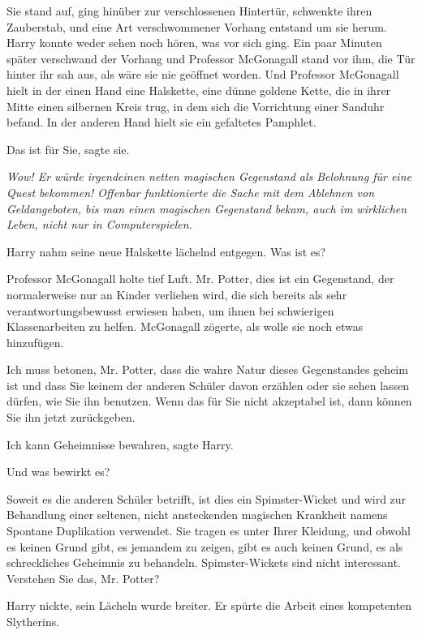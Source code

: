 Sie stand auf, ging hinüber zur verschlossenen Hintertür, schwenkte ihren
Zauberstab, und eine Art verschwommener Vorhang entstand um sie herum. Harry
konnte weder sehen noch hören, was vor sich ging. Ein paar Minuten später
verschwand der Vorhang und Professor McGonagall stand vor ihm, die Tür hinter
ihr sah aus, als wäre sie nie geöffnet worden. Und Professor McGonagall hielt in
der einen Hand eine Halskette, eine dünne goldene Kette, die in ihrer Mitte
einen silbernen Kreis trug, in dem sich die Vorrichtung einer Sanduhr befand. In
der anderen Hand hielt sie ein gefaltetes Pamphlet.

\glqq{}Das ist für Sie\grqq{}, sagte sie.

\emph{Wow! Er würde irgendeinen netten magischen Gegenstand als Belohnung für
eine Quest bekommen! Offenbar funktionierte die Sache mit dem Ablehnen von
Geldangeboten, bis man einen magischen Gegenstand bekam, auch im wirklichen
Leben, nicht nur in Computerspielen.}

Harry nahm seine neue Halskette lächelnd entgegen. \glqq{}Was ist es?\grqq{}

Professor McGonagall holte tief Luft. \glqq{}Mr. Potter, dies ist ein Gegenstand,
der normalerweise nur an Kinder verliehen wird, die sich bereits als sehr
verantwortungsbewusst erwiesen haben, um ihnen bei schwierigen Klassenarbeiten
zu helfen.\grqq{} McGonagall zögerte, als wolle sie noch etwas hinzufügen.

\glqq{}Ich muss betonen, Mr. Potter, dass die wahre Natur dieses Gegenstandes
geheim ist und dass Sie keinem der anderen Schüler davon erzählen oder sie sehen
lassen dürfen, wie Sie ihn benutzen. Wenn das für Sie nicht akzeptabel ist, dann
können Sie ihn jetzt zurückgeben.\grqq{}

\glqq{}Ich kann Geheimnisse bewahren\grqq{}, sagte Harry.

\glqq{}Und was bewirkt es?\grqq{}

\glqq{}Soweit es die anderen Schüler betrifft, ist dies ein Spimster-Wicket und
wird zur Behandlung einer seltenen, nicht ansteckenden magischen Krankheit
namens Spontane Duplikation verwendet. Sie tragen es unter Ihrer Kleidung, und
obwohl es keinen Grund gibt, es jemandem zu zeigen, gibt es auch keinen Grund,
es als schreckliches Geheimnis zu behandeln. Spimster-Wickets sind nicht
interessant. Verstehen Sie das, Mr. Potter?\grqq{}

Harry nickte, sein Lächeln wurde breiter. Er spürte die Arbeit eines kompetenten
Slytherins.

